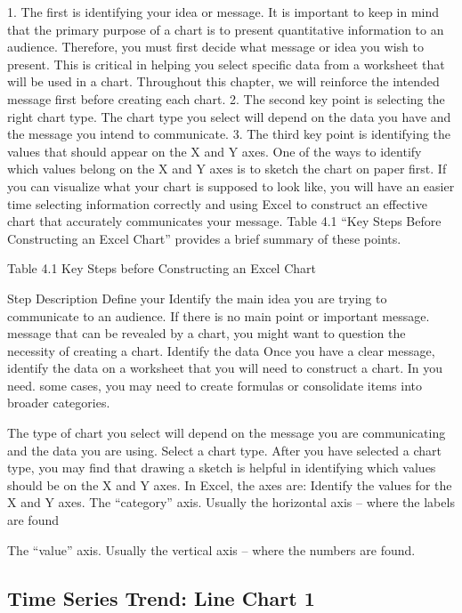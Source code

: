 1. The first is identifying your idea or message. It is important to keep in mind that the primary
purpose of a chart is to present quantitative information to an audience. Therefore, you must
first decide what message or idea you wish to present. This is critical in helping you select
specific data from a worksheet that will be used in a chart. Throughout this chapter, we will
reinforce the intended message first before creating each chart.
2. The second key point is selecting the right chart type. The chart type you select will depend
on the data you have and the message you intend to communicate.
3. The third key point is identifying the values that should appear on the X and Y axes. One of
the ways to identify which values belong on the X and Y axes is to sketch the chart on paper
first. If you can visualize what your chart is supposed to look like, you will have an easier time
selecting information correctly and using Excel to construct an effective chart that accurately
communicates your message. Table 4.1 “Key Steps Before Constructing an Excel Chart”
provides a brief summary of these points.


Table 4.1 Key Steps before Constructing an Excel Chart

Step                   Description
Define your            Identify the main idea you are trying to communicate to an audience. If there is no main point or important
message.               message that can be revealed by a chart, you might want to question the necessity of creating a chart.
Identify the data      Once you have a clear message, identify the data on a worksheet that you will need to construct a chart. In
you need.              some cases, you may need to create formulas or consolidate items into broader categories.


The type of chart you select will depend on the message you are communicating and the data you are using.
Select a chart type.
After you have selected a chart type, you may find that drawing a sketch is helpful in identifying which
values should be on the X and Y axes. In Excel, the axes are:
Identify the values
for the X and Y
axes.                  The “category” axis. Usually the horizontal axis – where the labels are found

The “value” axis. Usually the vertical axis – where the numbers are found.


\subsection{Time Series Trend: Line Chart 1}

